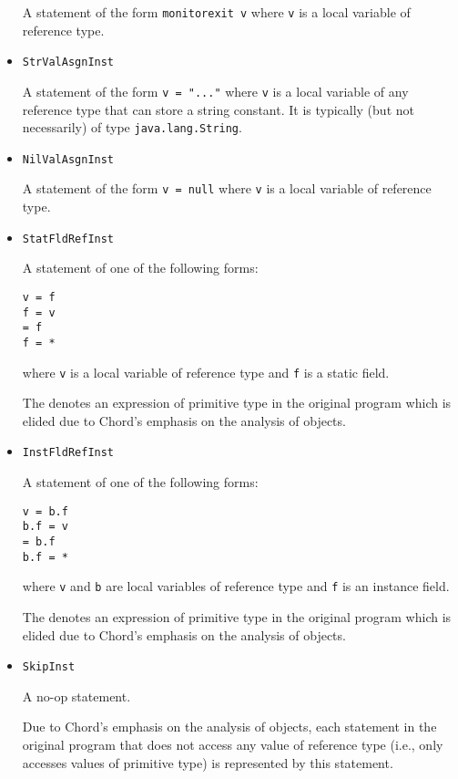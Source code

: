 \documentclass{article}
\providecommand\Chord{{Chord}}
\begin{document}
\begin{itemize}
A statement of the form {\tt monitorexit v} where {\tt v}
is a local variable of reference type.

\item
{\tt StrValAsgnInst}

A statement of the form {\tt v = "..."} where {\tt v} is
a local variable of any reference type that can store a string
constant.  It is typically (but not necessarily) of type
{\tt java.lang.String}.

\item
{\tt NilValAsgnInst}

A statement of the form {\tt v = null} where {\tt v}
is a local variable of reference type.

\item
{\tt StatFldRefInst}

A statement of one of the following forms:

{\tt v = f} \\
{\tt f = v} \\
{\tt * = f} \\
{\tt f = *}

where {\tt v} is a local variable of reference type and
{\tt f} is a static field.

The {\tt *} denotes an expression of primitive type in the
original program which is elided due to \Chord's emphasis on the
analysis of objects.

\item
{\tt InstFldRefInst}

A statement of one of the following forms:

{\tt v = b.f} \\
{\tt b.f = v} \\
{\tt * = b.f} \\
{\tt b.f = *}

where {\tt v} and {\tt b} are local variables of reference
type and {\tt f} is an instance field.

The {\tt *} denotes an expression of primitive type in the
original program which is elided due to \Chord's emphasis on the
analysis of objects.

\item
{\tt SkipInst}

A no-op statement.

Due to \Chord's emphasis on the analysis of objects, each statement
in the original program that does not access
any value of reference type (i.e., only accesses values of primitive
type) is represented by this statement.


\end{itemize}
\end{document}
